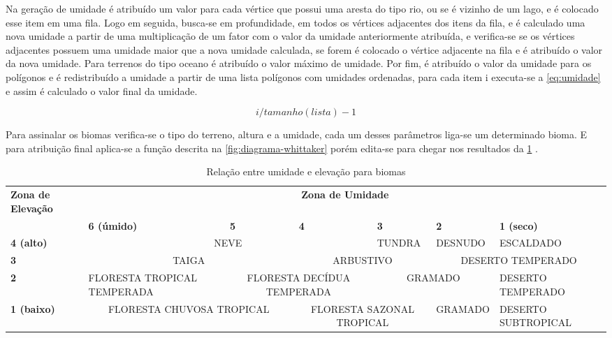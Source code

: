 Na geração de umidade é atribuído um valor para cada vértice que possui uma aresta do tipo rio, ou se é vizinho de um lago, e é colocado esse item em uma fila. Logo em seguida, busca-se em profundidade, em todos os vértices adjacentes dos itens da fila, e é calculado uma nova umidade a partir de uma multiplicação de um fator com o valor da umidade anteriormente atribuída, e verifica-se se os vértices adjacentes possuem uma umidade maior que a nova umidade calculada, se forem é colocado o vértice adjacente na fila e é atribuído o valor da nova umidade. Para terrenos do tipo oceano é atribuído o valor máximo de umidade.
Por fim, é atribuído o valor da umidade para os polígonos e é redistribuído a umidade a partir de uma lista polígonos com umidades ordenadas, para cada item i executa-se a \cref{eq:umidade} e assim é calculado o valor final da umidade.

\begin{equation}
	\label{eq:umidade}
	i / tamanho(lista) - 1
\end{equation}


Para assinalar os biomas verifica-se o tipo do terreno, altura e a umidade, cada um desses parâmetros liga-se um determinado bioma. E para atribuição final aplica-se a função descrita na \cref{fig:diagrama-whittaker} porém edita-se para chegar nos resultados da \cref{tab:biomes} \cite{amitp2010}.

\begin{table}
	\centering
	\caption{Relação entre umidade e elevação para biomas}
	\label{tab:biomes}
	\begin{tabularx}{\textwidth}{|X|X|X|X|X|X|X|}
	\hline
	\textbf{Zona de Elevação} & \multicolumn{6}{c|}{\textbf{Zona de Umidade}} \\
	\cline{2-7}
	 & \textbf{6 (úmido)} & \textbf{5} & \textbf{4} & \textbf{3} & \textbf{2} & \textbf{1 (seco)} \\
	\hline
	\textbf{4 (alto)} & \multicolumn{3}{|c|}{NEVE} & TUNDRA & DESNUDO & ESCALDADO  \\
	\hline
	\textbf{3} & \multicolumn{2}{|c|}{TAIGA} & \multicolumn{2}{|c|}{ARBUSTIVO} & \multicolumn{2}{|c|}{DESERTO TEMPERADO} \\
	\hline
	\textbf{2} & FLORESTA TROPICAL TEMPERADA & \multicolumn{2}{|c|}{FLORESTA DECÍDUA TEMPERADA} & \multicolumn{2}{|c|}{GRAMADO} & DESERTO TEMPERADO  \\
	\hline
	\textbf{1 (baixo)} &  \multicolumn{2}{|c|}{FLORESTA CHUVOSA TROPICAL} & \multicolumn{2}{|c|}{FLORESTA SAZONAL TROPICAL} & GRAMADO & DESERTO SUBTROPICAL  \\
	\hline
	\end{tabularx}
\end{table}

